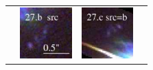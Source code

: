 \documentclass[useAMS,usenatbib]{mn2e}
\begin{document}
\begin{table}
\begin{tabular}{cccc}
    & \multicolumn{1}{m{1.7cm}}{\includegraphics[height=2.00cm,clip]{figs/enfw_img/rgb.src_27_b.ps}}
    & \multicolumn{1}{m{1.7cm}}{\includegraphics[height=2.00cm,clip]{figs/enfw_img/rgb.pre_27_c_b_tri.ps}} \\
  \end{tabular}

\end{table}

\clearpage
\end{document}

